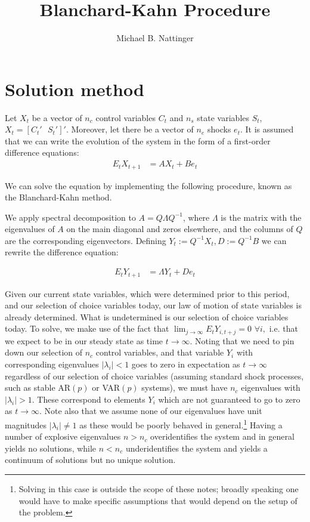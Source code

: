 \documentclass[11pt]{article} %
\title{Blanchard-Kahn Procedure}
\author{Michael B. Nattinger}
\begin{document}
\maketitle
\section{Solution method}
Let $X_t$ be a vector of $n_c$ control variables $C_t$ and $n_s$ state variables $S_t$, $X_t = [C_t'\text{ }S_t']'$. Moreover, let there be a vector of $n_e$ shocks $e_t.$ It is assumed that we can write the evolution of the system in the form of a first-order difference equations:
\begin{align*}
E_tX_{t+1} &= AX_t +B e_t
\end{align*}

We can solve the equation by implementing the following procedure, known as the Blanchard-Kahn method.

We apply spectral decomposition to  $A = Q \Lambda Q^{-1}$, where $\Lambda$ is the matrix with the eigenvalues of $A$ on the main diagonal and zeros elsewhere, and the columns of $Q$ are the corresponding eigenvectors. Defining $Y_t := Q^{-1}X_t, D := Q^{-1} B $ we can rewrite the difference equation:

\begin{align}
E_tY_{t+1} &= \Lambda Y_t + D e_t \label{general}
\end{align}

Given our current state variables, which were determined prior to this period, and our selection of choice variables today, our law of motion of state variables is already determined. What is undetermined is our selection of choice variables today. To solve, we make use of the fact that $\lim_{j\rightarrow \infty}E_t Y_{i,t+j} = 0$ $\forall i,$ i.e. that we expect to be in our steady state as time $t\rightarrow\infty$. Noting that we need to pin down our selection of $n_c$ control variables, and that variable $Y_i$ with corresponding eigenvalues $|\lambda_i|<1$ goes to zero in expectation as  $t\rightarrow \infty$ regardless of our selection of choice variables (assuming standard shock processes, such as stable AR$(p)$ or VAR$(p)$ systems), we must have $n_c$ eigenvalues with $|\lambda_i|>1$. These correspond to elements $Y_i$ which are not guaranteed to go to zero as $t\rightarrow \infty$. Note also that we assume none of our eigenvalues have unit magnitudes $|\lambda_i| \neq 1$ as these would be poorly behaved in general.\footnote{Solving in this case is outside the scope of these notes; broadly speaking one would have to make specific assumptions that would depend on the setup of the problem.} Having a number of explosive eigenvalues $n>n_c$ overidentifies the system and in general yields no solutions, while $n<n_c$ underidentifies the system and yields a continuum of solutions but no unique solution.
\end{document}

